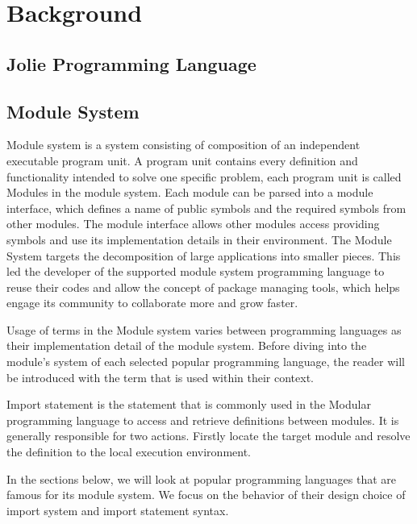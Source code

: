 \chapter{Background}

\section{Jolie Programming Language}



\section{Module System}

Module system is a system consisting of composition of an independent executable program unit. A program unit contains every definition and functionality intended to solve one specific problem, each program unit is called Modules in the module system. Each module can be parsed into a module interface, which defines a name of public symbols and the required symbols from other modules. The module interface allows other modules access providing symbols and use its implementation details in their environment. The Module System targets the decomposition of large applications into smaller pieces. This led the developer of the supported module system programming language to reuse their codes and allow the concept of package managing tools, which helps engage its community to collaborate more and grow faster.

Usage of terms in the Module system varies between programming languages as their implementation detail of the module system. Before diving into the module's system of each selected popular programming language, the reader will be introduced with the term that is used within their context.

Import statement is the statement that is commonly used in the Modular programming language to access and retrieve definitions between modules. It is generally responsible for two actions. Firstly locate the target module and resolve the definition to the local execution environment.

In the sections below, we will look at popular programming languages that are famous for its module system. We focus on the behavior of their design choice of import system and import statement syntax.







